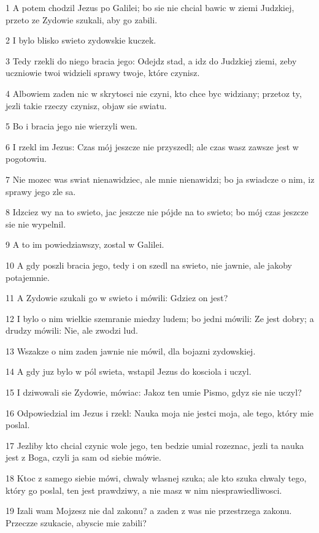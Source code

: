 \par 1 A potem chodzil Jezus po Galilei; bo sie nie chcial bawic w ziemi Judzkiej, przeto ze Zydowie szukali, aby go zabili.
\par 2 I bylo blisko swieto zydowskie kuczek.
\par 3 Tedy rzekli do niego bracia jego: Odejdz stad, a idz do Judzkiej ziemi, zeby uczniowie twoi widzieli sprawy twoje, które czynisz.
\par 4 Albowiem zaden nic w skrytosci nie czyni, kto chce byc widziany; przetoz ty, jezli takie rzeczy czynisz, objaw sie swiatu.
\par 5 Bo i bracia jego nie wierzyli wen.
\par 6 I rzekl im Jezus: Czas mój jeszcze nie przyszedl; ale czas wasz zawsze jest w pogotowiu.
\par 7 Nie mozec was swiat nienawidziec, ale mnie nienawidzi; bo ja swiadcze o nim, iz sprawy jego zle sa.
\par 8 Idzciez wy na to swieto, jac jeszcze nie pójde na to swieto; bo mój czas jeszcze sie nie wypelnil.
\par 9 A to im powiedziawszy, zostal w Galilei.
\par 10 A gdy poszli bracia jego, tedy i on szedl na swieto, nie jawnie, ale jakoby potajemnie.
\par 11 A Zydowie szukali go w swieto i mówili: Gdziez on jest?
\par 12 I bylo o nim wielkie szemranie miedzy ludem; bo jedni mówili: Ze jest dobry; a drudzy mówili: Nie, ale zwodzi lud.
\par 13 Wszakze o nim zaden jawnie nie mówil, dla bojazni zydowskiej.
\par 14 A gdy juz bylo w pól swieta, wstapil Jezus do kosciola i uczyl.
\par 15 I dziwowali sie Zydowie, mówiac: Jakoz ten umie Pismo, gdyz sie nie uczyl?
\par 16 Odpowiedzial im Jezus i rzekl: Nauka moja nie jestci moja, ale tego, który mie poslal.
\par 17 Jezliby kto chcial czynic wole jego, ten bedzie umial rozeznac, jezli ta nauka jest z Boga, czyli ja sam od siebie mówie.
\par 18 Ktoc z samego siebie mówi, chwaly wlasnej szuka; ale kto szuka chwaly tego, który go poslal, ten jest prawdziwy, a nie masz w nim niesprawiedliwosci.
\par 19 Izali wam Mojzesz nie dal zakonu? a zaden z was nie przestrzega zakonu. Przeczze szukacie, abyscie mie zabili?
